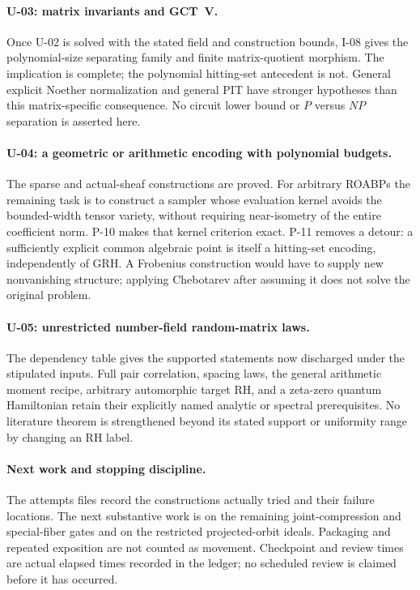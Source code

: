\documentclass[11pt,a4paper]{article}
\theoremstyle{definition}\newtheorem{definition}{Definition}
\begin{document}
\paragraph{U-03: matrix invariants and GCT~V.}
Once U-02 is solved with the stated field and construction bounds, I-08 gives the polynomial-size separating family and finite matrix-quotient morphism. The implication is complete; the polynomial hitting-set antecedent is not. General explicit Noether normalization and general PIT have stronger hypotheses than this matrix-specific consequence. No circuit lower bound or $P$ versus $NP$ separation is asserted here.

\paragraph{U-04: a geometric or arithmetic encoding with polynomial budgets.}
The sparse and actual-sheaf constructions are proved. For arbitrary ROABPs the remaining task is to construct a sampler whose evaluation kernel avoids the bounded-width tensor variety, without requiring near-isometry of the entire coefficient norm. P-10 makes that kernel criterion exact. P-11 removes a detour: a sufficiently explicit common algebraic point is itself a hitting-set encoding, independently of GRH. A Frobenius construction would have to supply new nonvanishing structure; applying Chebotarev after assuming it does not solve the original problem.

\paragraph{U-05: unrestricted number-field random-matrix laws.}
The dependency table gives the supported statements now discharged under the stipulated inputs. Full pair correlation, spacing laws, the general arithmetic moment recipe, arbitrary automorphic target RH, and a zeta-zero quantum Hamiltonian retain their explicitly named analytic or spectral prerequisites. No literature theorem is strengthened beyond its stated support or uniformity range by changing an RH label.

\paragraph{Next work and stopping discipline.}
The attempts files record the constructions actually tried and their failure locations. The next substantive work is on the remaining joint-compression and special-fiber gates and on the restricted projected-orbit ideals. Packaging and repeated exposition are not counted as movement. Checkpoint and review times are actual elapsed times recorded in the ledger; no scheduled review is claimed before it has occurred.
\end{document}
